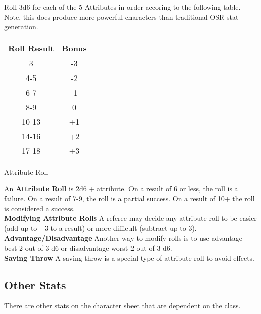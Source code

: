 \documentclass[18pt]{article}
\begin{document}
\begin{multicols}{2}
Roll 3d6 for each of the 5 Attributes in order accoring to the following table. Note, this does produce more powerful characters than traditional OSR stat generation.


\begin{table}[H]

\begin{center}
\Large
{}
\begin{tabular}{ c  c  }


\textbf{
Roll Result} &\textbf{ Bonus}\\
\bottomrule
\bottomrule

3 & -3 \\

4-5 & -2 \\

6-7 & -1 \\

8-9 & 0 \\

10-13 & +1 \\

14-16 & +2 \\

17-18 & +3 \\

\end{tabular}
\end{center}
\label{table:RollingAttributes}
\vspace{-1cm}
\end{table}
\vspace{1cm}
\begin{mercHeading}
Attribute Roll
\end{mercHeading}

An \textbf{Attribute Roll} is 2d6 + attribute. On a result of 6 or less, the roll is a failure. On a result of 7-9, the roll is a partial success. On a result of 10+ the roll is considered a success.\\
\textbf{Modifying Attribute Rolls} A referee may decide any attribute roll to be easier (add up to +3 to a result) or more difficult (subtract up to 3). \\
\textbf{Advantage/Disadvantage} Another way to modify rolls is to use advantage best 2 out of 3 d6 or disadvantage worst 2 out of 3 d6.\\
\textbf{Saving Throw} A saving throw is a special type of attribute roll to avoid effects.
\subsection*{Other Stats}
There are other stats on the character sheet that are dependent on the class.




\end{multicols}
\end{document}

